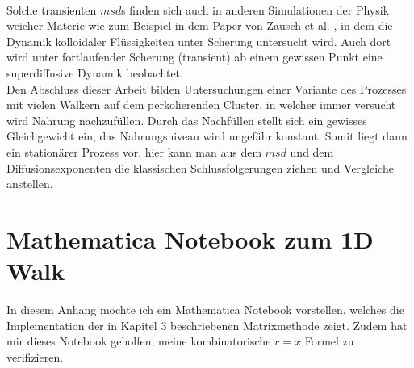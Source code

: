 \documentclass[a4paper, 12pt]{report}
\begin{document}
\\
Solche transienten $msd$s finden sich auch in anderen Simulationen der Physik weicher Materie wie zum Beispiel in dem Paper von Zausch et al. \cite{Zausch_2008}, in dem die Dynamik kolloidaler Flüssigkeiten unter Scherung untersucht wird. Auch dort wird unter fortlaufender Scherung (transient) ab einem gewissen Punkt eine superdiffusive Dynamik beobachtet.
\\
Den Abschluss dieser Arbeit bilden Untersuchungen einer Variante des Prozesses mit vielen Walkern auf dem perkolierenden Cluster, in welcher immer versucht wird Nahrung nachzufüllen. Durch das Nachfüllen stellt sich ein gewisses Gleichgewicht ein, das Nahrungsniveau wird ungefähr konstant. Somit liegt dann ein stationärer Prozess vor, hier kann man aus dem $msd$ und dem Diffusionsexponenten die klassischen Schlussfolgerungen ziehen und Vergleiche anstellen.



\appendix
\chapter{Mathematica Notebook zum 1D Walk}
In diesem Anhang möchte ich ein Mathematica Notebook vorstellen, welches die Implementation der in Kapitel 3 beschriebenen Matrixmethode zeigt. Zudem hat mir dieses Notebook geholfen, meine kombinatorische $r=x$ Formel zu verifizieren.
	






\end{document}
